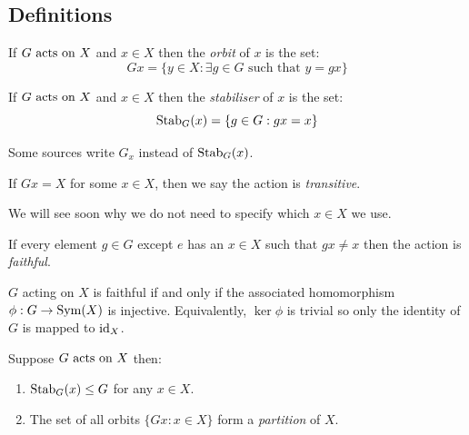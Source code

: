 \documentclass[../main.tex]{subfiles}
\begin{document}
\subsection{Definitions}
\begin{definition}[Orbit]
  If $G \text{ acts on } X$ and $x \in X$ then the \textit{orbit} of $x$ is the set:
  \[
    Gx = \{y \in X : \exists g \in G \text{ such that } y = gx\}
  \]
\end{definition}
\begin{definition}[Stabiliser]
  If $G \text{ acts on } X$ and $x \in X$ then the \textit{stabiliser} of $x$ is the set:
  \[
    \operatorname{Stab}_G(x) = \{g \in G : gx = x\}
  \]
\end{definition}
\begin{remark}[Warning]
  Some sources write $G_x$ instead of $\operatorname{Stab}_G(x)$.
\end{remark}
\begin{definition}[Transitive]
  If $Gx = X$ for some $x \in X$, then we say the action is \textit{transitive}.
\end{definition}
\begin{remark}
  We will see soon why we do not need to specify which $x \in X$ we use.
\end{remark}
\begin{definition}[Faithful]
  If every element $g \in G$ except $e$ has an $x \in X$ such that $gx \neq x$ then the action is \textit{faithful}.
\end{definition}
\begin{remark}
  $G$ acting on $X$ is faithful if and only if the associated homomorphism $\phi: G \to \operatorname{Sym}(X)$ is injective.
  Equivalently, $\ker \phi$ is trivial so only the identity of $G$ is mapped to $\mathrm{id}_X$.
\end{remark}
\begin{proposition}
  Suppose $G \text{ acts on } X$ then: \label{stabSubgroup}
  \begin{enumerate}
    \item $\operatorname{Stab}_G(x) \leq G$ for any $x \in X$.
    \item The set of all orbits $\{Gx : x \in X\}$ form a \textit{partition} of $X$.
  \end{enumerate}
\end{proposition}
\end{document}
